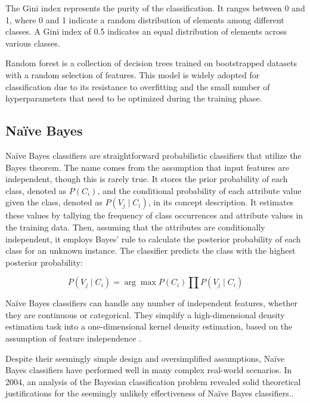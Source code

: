 The Gini index represents the purity of the classification. It ranges between 0 and 1, where 0 and 1 indicate a random distribution of elements among different classes. A Gini index of 0.5 indicates an equal distribution of elements across various classes.

Random forest \cite{L_Breiman2001} is a collection of decision trees trained on bootstrapped datasets with a random selection of features. This model is widely adopted for classification due to its resistance to overfitting \cite{OverfittingWebb} and the small number of hyperparameters that need to be optimized during the training phase.



\subsection{Naïve Bayes} %
\label{sub: Naive_Bayes}

Naïve Bayes classifiers \cite{I_H_Witten2011} are straightforward probabilistic classifiers that utilize the Bayes theorem. The name comes from the assumption that input features are independent, though this is rarely true. It stores the prior probability of each class, denoted as $P(C_i)$, and the conditional probability of each attribute value given the class, denoted as $P(V_j \mid C_i)$, in its concept description. It estimates these values by tallying the frequency of class occurrences and attribute values in the training data. Then, assuming that the attributes are conditionally independent, it employs Bayes' rule to calculate the posterior probability of each class for an unknown instance. The classifier predicts the class with the highest posterior probability:

\[ P(V_j \mid C_i) =  \arg \max{ P(C_i) \prod P(V_j \mid C_i)} \]

Naïve Bayes classifiers can handle any number of independent features, whether they are continuous or categorical. They simplify a high-dimensional density estimation task into a one-dimensional kernel density estimation, based on the assumption of feature independence \cite{Anna_L2016}.

Despite their seemingly simple design and oversimplified assumptions, Naïve Bayes classifiers have performed well in many complex real-world scenarios. In 2004, an analysis of the Bayesian classification problem revealed solid theoretical justifications for the seemingly unlikely effectiveness of Naïve Bayes classifiers.\cite{Harry_Zhang2004}.

